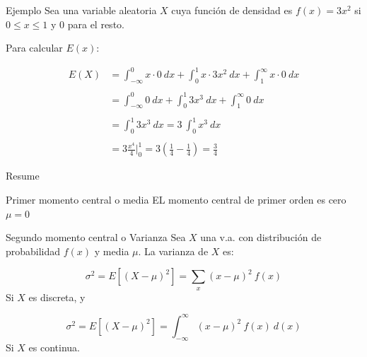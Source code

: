\documentclass{beamer}
\begin{document}
\begin{frame}{Ejemplo}
Sea una variable aleatoria $X$ cuya función de densidad es $f(x)=3x^2$ si $0
\leq x \leq 1$ y $0$ para el resto.

Para calcular $E(x)$:

\begin{equation}
  \begin{array}{rl}
    E(X)  & = \int_{- \infty}^{0} x \cdot 0 \ dx + \int_{0}^{1} x \cdot 3x^2 \ dx + \int_{1}^{\infty} x \cdot 0 \ dx \\
    \\
          & = \int_{- \infty}^{0} 0 \ dx + \int_{0}^{1} 3x^3 \ dx + \int_{1}^{\infty} 0 \ dx \\
    \\
          & = \int_{0}^{1} 3x^3 \ dx = 3 \ \int_{0}^{1} x^3 \ dx \\
    \\
          & = 3 \frac{x^4}{4} |_{0}^{1} = 3(\frac{1}{4} - \frac{1}{4}) = \frac{3}{4}
  \end{array}
\end{equation}

\end{frame}

\begin{frame}{Resume}
  \begin{block}{Primer momento central o media}
    EL momento central de primer orden es cero $\mu = 0$
  \end{block}

  \begin{block}{Segundo momento central o Varianza}
    Sea $X$ una v.a. con distribución de probabilidad $f(x)$ y media $\mu$. La
    varianza de $X$ es:

    \begin{equation}
      \sigma^2 = E[(X-\mu)^2] = \sum_{x}(x-\mu)^2 \ f(x)
    \end{equation}
    Si $X$ es discreta, y 

    \begin{equation}
      \sigma^2 = E[(X-\mu)^2] = \int_{-\infty}^{\infty}(x-\mu)^2 \ f(x) \ d(x)
    \end{equation}
    Si $X$ es continua.

  \end{block}

\end{frame}
\end{document}
